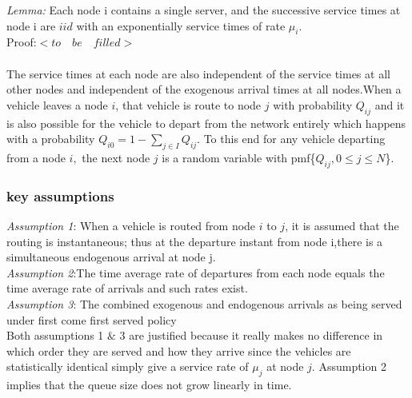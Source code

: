 \documentclass[a4paper,12pt]{scrartcl}
\begin{document}
\textit{Lemma:} Each node i contains a single server, and the successive service times at node i are $iid$ with an exponentially service times of rate $\mu_i$.\\
Proof:$< to \quad be \quad filled>$\\
\\
The service times at each node are also independent of the service times at all other nodes and independent of the exogenous arrival times at all nodes.When a vehicle leaves a node $i$, that vehicle is route to node $j$ with probability $Q_{ij}$ and it is also possible for the vehicle to depart from the network entirely which happens with a probability $Q_{i0} = 1 - \sum_{j \in I}Q_{ij}.$ To this end for any vehicle departing from a node $i,$ the next node $j$ is a random variable with pmf\{$Q_{ij},0 \leq j \leq N$\}.

\subsubsection*{key assumptions}
\textit{Assumption 1}: When a vehicle is routed from node $i$ to $j$, it is assumed that the routing is instantaneous; thus at the departure instant from node i,there is a simultaneous endogenous arrival at node j.\\
\textit{Assumption 2}:The time average rate of departures from each node equals the time average rate of arrivals and such rates exist.\\
\textit{Assumption 3}: The combined exogenous and endogenous arrivals as being served under first come first served policy\\
Both assumptions 1 $\&$ 3 are justified because it really makes no difference in which order they are served and how they arrive since the vehicles are statistically identical  simply give a service rate of $\mu_j$ at node $j$. Assumption 2 implies that the queue size does not grow linearly in time. 
\newpage
\end{document}
